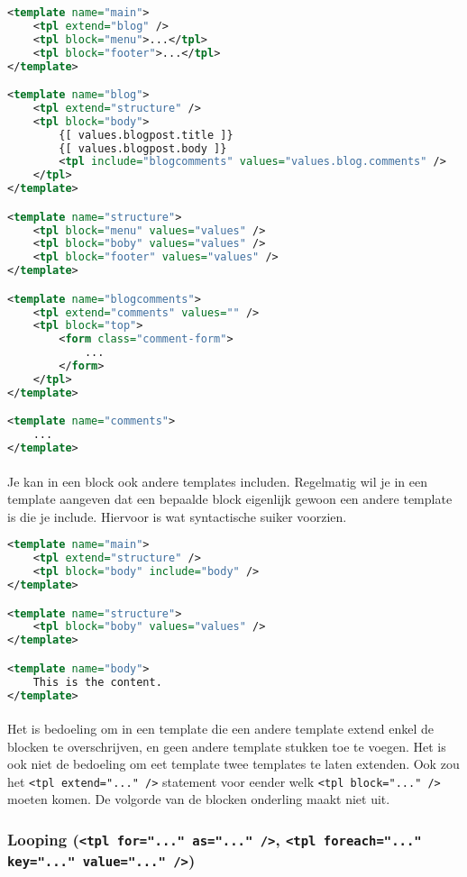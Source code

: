 \begin{lstlisting}[language=xml]
<template name="main">
	<tpl extend="blog" />
	<tpl block="menu">...</tpl>
	<tpl block="footer">...</tpl>
</template>

<template name="blog">
	<tpl extend="structure" />
	<tpl block="body">
		{[ values.blogpost.title ]}
		{[ values.blogpost.body ]}
		<tpl include="blogcomments" values="values.blog.comments" />
	</tpl>
</template>

<template name="structure">
	<tpl block="menu" values="values" />
	<tpl block="boby" values="values" />
	<tpl block="footer" values="values" />
</template>

<template name="blogcomments">
	<tpl extend="comments" values="" />
	<tpl block="top">
		<form class="comment-form">
			...
		</form>
	</tpl>
</template>

<template name="comments">
	...
</template>
\end{lstlisting}

\paragraph {} Je kan in een block ook andere templates includen. Regelmatig wil je in een
template aangeven dat een bepaalde block eigenlijk gewoon een andere template is die je
include. Hiervoor is wat syntactische suiker voorzien.

\begin{lstlisting}[language=xml]
<template name="main">
	<tpl extend="structure" />
	<tpl block="body" include="body" />
</template>

<template name="structure">
	<tpl block="boby" values="values" />
</template>

<template name="body">
	This is the content.
</template>
\end{lstlisting}

\paragraph {} Het is bedoeling om in een template die een andere template extend
enkel de blocken te overschrijven, en geen andere template stukken toe te voegen. Het is
ook niet de bedoeling om eet template twee templates te laten extenden. Ook zou het
\lstinline{<tpl extend="..." />} statement voor eender welk \lstinline{<tpl block="..." />}
moeten komen. De volgorde van de blocken onderling maakt niet uit.


\subsubsection {Looping (\lstinline{<tpl for="..." as="..." />}, \lstinline{<tpl foreach="..." key="..." value="..." />})}

